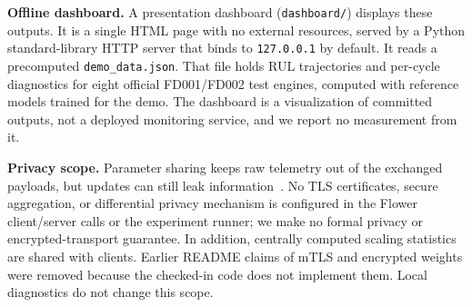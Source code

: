 \textbf{Offline dashboard.} A presentation dashboard (\texttt{dashboard/}) displays these outputs. It is a single HTML page with no external resources, served by a Python standard-library HTTP server that binds to \texttt{127.0.0.1} by default. It reads a precomputed \texttt{demo\_data.json}. That file holds RUL trajectories and per-cycle diagnostics for eight official FD001/FD002 test engines, computed with reference models trained for the demo. The dashboard is a visualization of committed outputs, not a deployed monitoring service, and we report no measurement from it.

\textbf{Privacy scope.} Parameter sharing keeps raw telemetry out of the exchanged payloads, but updates can still leak information~\cite{abadi2016dpsgd}. No TLS certificates, secure aggregation, or differential privacy mechanism is configured in the Flower client/server calls or the experiment runner; we make no formal privacy or encrypted-transport guarantee. In addition, centrally computed scaling statistics are shared with clients. Earlier README claims of mTLS and encrypted weights were removed because the checked-in code does not implement them. Local diagnostics do not change this scope.
